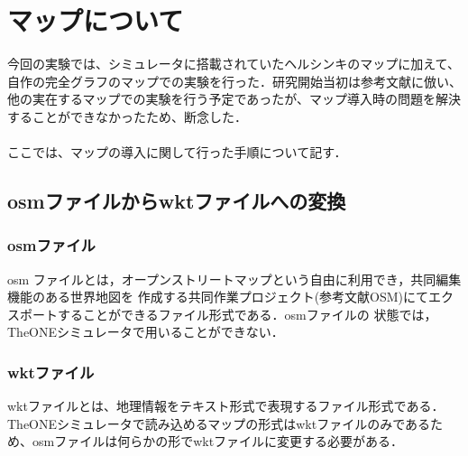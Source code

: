 \documentclass[11pt]{icsthesis}
\begin{document}
\clearpage
\nocite{*}

\fancyhead[L]{\nouppercase{\small\leftmark}}\fancyhead[R]{}
\renewcommand{\headrulewidth}{0.3truemm}


\clearpage
\fancyhead[L]{\nouppercase{\small\leftmark}}
\fancyhead[R]{\nouppercase{\small\rightmark}}
\fancyfoot[C]{--\ \thepage\ --}
\renewcommand{\headrulewidth}{0.3truemm}
\appendix
\chapter{マップについて}
今回の実験では、シミュレータに搭載されていたヘルシンキのマップに加えて、自作の完全グラフのマップでの実験を行った．研究開始当初は参考文献に倣い、他の実在するマップでの実験を行う予定であったが、マップ導入時の問題を解決することができなかったため、断念した．\\\\
ここでは、マップの導入に関して行った手順について記す．

\section{osmファイルからwktファイルへの変換}



\subsection{osmファイル}
osm ファイルとは，オープンストリートマップという自由に利用でき，共同編集機能のある世界地図を
作成する共同作業プロジェクト(参考文献OSM)にてエクスポートすることができるファイル形式である．osmファイルの
状態では，TheONEシミュレータで用いることができない．
\subsection{wktファイル}
wktファイルとは、地理情報をテキスト形式で表現するファイル形式である．TheONEシミュレータで読み込めるマップの形式はwktファイルのみであるため、osmファイルは何らかの形でwktファイルに変更する必要がある．
\end{document}

